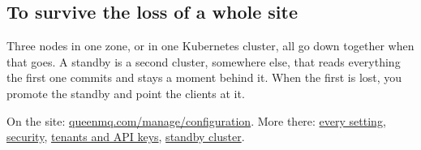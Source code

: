 \subsection{To survive the loss of a whole site}

Three nodes in one zone, or in one Kubernetes cluster, all go down together when that goes. A
standby is a second cluster, somewhere else, that reads everything the first one commits and stays
a moment behind it. When the first is lost, you promote the standby and point the clients at it.


On the site: \href{https://queenmq.com/manage/configuration/}{queenmq.com/manage/configuration}. More there: \href{https://queenmq.com/reference/configuration/}{every setting}, \href{https://queenmq.com/manage/security/}{security}, \href{https://queenmq.com/manage/tenants/}{tenants and API keys}, \href{https://queenmq.com/manage/standby/}{standby cluster}.
